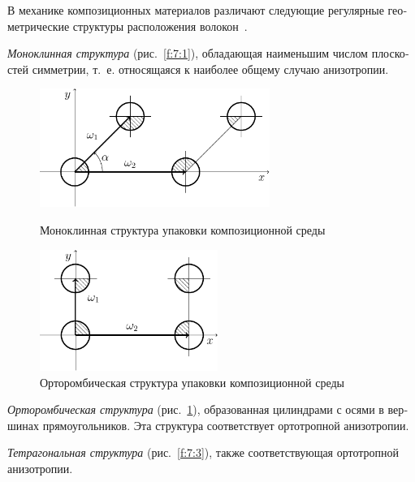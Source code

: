 \begin{russian}
В механике композиционных материалов различают следующие регулярные геометрические структуры расположения волокон~\cite{Vanin1985}.

\textit{Моноклинная структура} (рис.~\ref{f:7:1}), обладающая наименьшим числом плоскостей симметрии, т.~е. относящаяся к наиболее общему случаю анизотропии.{\sloppy\par}

\begin{figure}[h!]
\centering\footnotesize
\parbox[b]{7.5cm}{\centering\includegraphics[width=7.5cm]{monoclin.pdf}
\caption{Моноклинная структура упаковки композиционной среды
\label{f:7:1}}}\hfil\hfil
\parbox[b]{7.5cm}{\centering\includegraphics[width=5.8cm]{orthoromb.pdf}
\caption{Орторомбическая структура упаковки композиционной среды
\label{f:7:2}}}
\end{figure}


\textit{Орторомбическая структура} (рис.~\ref{f:7:2}), образованная цилиндрами с осями в вершинах прямоугольников. Эта структура соответствует ортотропной анизотропии.


\textit{Тетрагональная структура} (рис.~\ref{f:7:3}), также соответствующая ортотропной анизотропии.


\end{russian}
